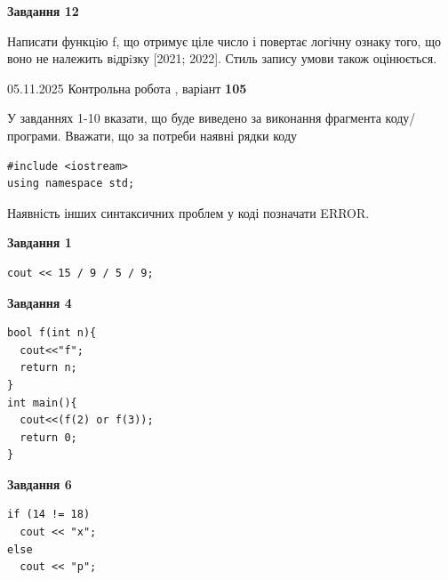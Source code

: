 \documentclass[12pt, ukrainian]{article}
\begin{document}
{\begin {large}
\begin{minipage}[t]{11.0cm}
\begin{center}
\textbf{Завдання 12}
\end{center}

Написати функцiю f, що отримує ціле число і повертає логічну ознаку того, що воно не належить вiдрiзку [2021; 2022]. Стиль запису умови також оцінюється.\par

\end{minipage}

\end {large}}
\newpage

{\Large{05.11.2025 Контрольна робота , варіант  \No \textbf { 105 }\par}}
{
\begin {large}
У завданнях 1-10 вказати, що буде виведено за виконання фрагмента коду/про\-гра\-ми.
Вважати, що за потреби наявні рядки коду
\begin{verbatim}
#include <iostream>
using namespace std;
\end{verbatim}
Наявність інших синтаксичних проблем у коді позначати ERROR.

\begin{minipage}[t]{7.0cm}

\begin{center}
\textbf{Завдання 1}
\end{center}
\vspace{-8mm}

\begin{verbatim}
cout << 15 / 9 / 5 / 9;
\end{verbatim}



\begin{center}
\textbf{Завдання 4}
\end{center}
\vspace{-8mm}

\begin{verbatim}
bool f(int n){
  cout<<"f";
  return n;
}
int main(){
  cout<<(f(2) or f(3));
  return 0;
}
\end{verbatim}



\begin{center}
\textbf{Завдання 6}
\end{center}
\vspace{-8mm}

\begin{verbatim}
if (14 != 18)
  cout << "x";
else
  cout << "p";
\end{verbatim}




\end{minipage}
\end{large}}
\end{document}
